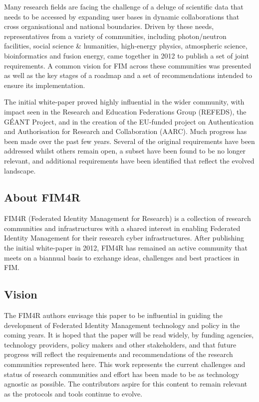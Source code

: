 \documentclass[fleqn,10pt]{wlscirep}
\begin{document}
{Many research fields are facing the challenge of a deluge of scientific data that needs to be accessed by expanding user bases in dynamic collaborations that cross organisational and national boundaries. Driven by these needs, representatives from a variety of communities, including photon/neutron facilities, social science \& humanities, high-energy physics, atmospheric science, bioinformatics and fusion energy, came together in 2012 to publish a set of joint requirements. A common vision for FIM across these communities was presented as well as the key stages of a roadmap and a set of recommendations intended to ensure its implementation. 

The initial white-paper proved highly influential in the wider community, with impact seen in the Research and Education Federations Group (REFEDS)\cite{refeds}, the GÉANT Project\cite{GN4}, and in the creation of the EU-funded project on Authentication and Authorisation for Research and Collaboration (AARC)\cite{aarc}. Much progress has been made over the past few years. Several of the original requirements have been addressed whilst others remain open, a subset have been found to be no longer relevant, and additional requirements have been identified that reflect the evolved landscape. 

\subsection{About FIM4R}
FIM4R\cite{fim4rweb} (Federated Identity Management for Research) is a collection of research communities and infrastructures with a shared interest in enabling Federated Identity Management for their research cyber infrastructures. After publishing the initial white-paper in 2012, FIM4R has remained an active community that meets on a biannual basis to exchange ideas, challenges and best practices in FIM.  

\subsection{Vision}
The FIM4R authors envisage this paper to be influential in guiding the development of Federated Identity Management technology and policy in the coming years. It is hoped that the paper will be read widely, by funding agencies, technology providers, policy makers and other stakeholders, and that future progress will reflect the requirements and recommendations of the research communities represented here. This work represents the current challenges and status of research communities and effort has been made to be as technology agnostic as possible. The contributors aspire for this content to remain relevant as the protocols and tools continue to evolve. 

}
\end{document}

